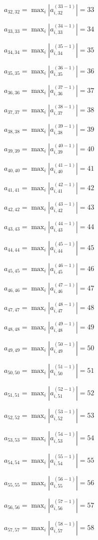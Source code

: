 \documentclass[a4paper,12pt]{article}
\begin{document}
$a _{ 32, 32 } =  \max _i |a _{ i, 32 } ^{ (33 - 1) } | = 33$

$a _{ 33, 33 } =  \max _i |a _{ i, 33 } ^{ (34 - 1) } | = 34$

$a _{ 34, 34 } =  \max _i |a _{ i, 34 } ^{ (35 - 1) } | = 35$

$a _{ 35, 35 } =  \max _i |a _{ i, 35 } ^{ (36 - 1) } | = 36$

$a _{ 36, 36 } =  \max _i |a _{ i, 36 } ^{ (37 - 1) } | = 37$

$a _{ 37, 37 } =  \max _i |a _{ i, 37 } ^{ (38 - 1) } | = 38$

$a _{ 38, 38 } =  \max _i |a _{ i, 38 } ^{ (39 - 1) } | = 39$

$a _{ 39, 39 } =  \max _i |a _{ i, 39 } ^{ (40 - 1) } | = 40$

$a _{ 40, 40 } =  \max _i |a _{ i, 40 } ^{ (41 - 1) } | = 41$

$a _{ 41, 41 } =  \max _i |a _{ i, 41 } ^{ (42 - 1) } | = 42$

$a _{ 42, 42 } =  \max _i |a _{ i, 42 } ^{ (43 - 1) } | = 43$

$a _{ 43, 43 } =  \max _i |a _{ i, 43 } ^{ (44 - 1) } | = 44$

$a _{ 44, 44 } =  \max _i |a _{ i, 44 } ^{ (45 - 1) } | = 45$

$a _{ 45, 45 } =  \max _i |a _{ i, 45 } ^{ (46 - 1) } | = 46$

$a _{ 46, 46 } =  \max _i |a _{ i, 46 } ^{ (47 - 1) } | = 47$

$a _{ 47, 47 } =  \max _i |a _{ i, 47 } ^{ (48 - 1) } | = 48$

$a _{ 48, 48 } =  \max _i |a _{ i, 48 } ^{ (49 - 1) } | = 49$

$a _{ 49, 49 } =  \max _i |a _{ i, 49 } ^{ (50 - 1) } | = 50$

$a _{ 50, 50 } =  \max _i |a _{ i, 50 } ^{ (51 - 1) } | = 51$

$a _{ 51, 51 } =  \max _i |a _{ i, 51 } ^{ (52 - 1) } | = 52$

$a _{ 52, 52 } =  \max _i |a _{ i, 52 } ^{ (53 - 1) } | = 53$

$a _{ 53, 53 } =  \max _i |a _{ i, 53 } ^{ (54 - 1) } | = 54$

$a _{ 54, 54 } =  \max _i |a _{ i, 54 } ^{ (55 - 1) } | = 55$

$a _{ 55, 55 } =  \max _i |a _{ i, 55 } ^{ (56 - 1) } | = 56$

$a _{ 56, 56 } =  \max _i |a _{ i, 56 } ^{ (57 - 1) } | = 57$

$a _{ 57, 57 } =  \max _i |a _{ i, 57 } ^{ (58 - 1) } | = 58$
\end{document}
